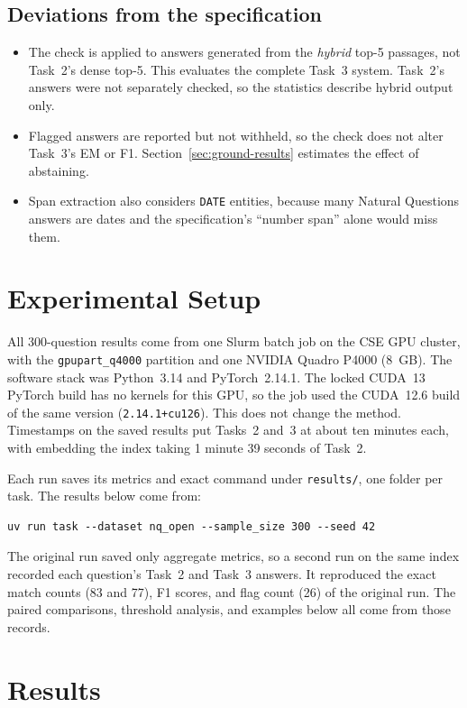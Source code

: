 \documentclass[11pt,a4paper]{article}
\begin{document}
\subsection{Deviations from the specification}
\begin{itemize}
    \item The check is applied to answers generated from the \emph{hybrid} top-5 passages, not Task~2's dense top-5. This evaluates the complete Task~3 system. Task~2's answers were not separately checked, so the statistics describe hybrid output only.
    \item Flagged answers are reported but not withheld, so the check does not alter Task~3's EM or F1. Section~\ref{sec:ground-results} estimates the effect of abstaining.
    \item Span extraction also considers \texttt{DATE} entities, because many Natural Questions answers are dates and the specification's ``number span'' alone would miss them.
\end{itemize}

\section{Experimental Setup}

All 300-question results come from one Slurm batch job on the CSE GPU cluster, with the \texttt{gpupart\_q4000} partition and one NVIDIA Quadro P4000 (8~GB). The software stack was Python~3.14 and PyTorch~2.14.1. The locked CUDA~13 PyTorch build has no kernels for this GPU, so the job used the CUDA~12.6 build of the same version (\texttt{2.14.1+cu126}). This does not change the method. Timestamps on the saved results put Tasks~2 and~3 at about ten minutes each, with embedding the index taking 1 minute 39 seconds of Task~2.

Each run saves its metrics and exact command under \texttt{results/}, one folder per task. The results below come from:
\begin{lstlisting}
uv run task --dataset nq_open --sample_size 300 --seed 42
\end{lstlisting}

The original run saved only aggregate metrics, so a second run on the same index recorded each question's Task~2 and Task~3 answers. It reproduced the exact match counts (83 and 77), F1 scores, and flag count (26) of the original run. The paired comparisons, threshold analysis, and examples below all come from those records.

\section{Results}
\end{document}
